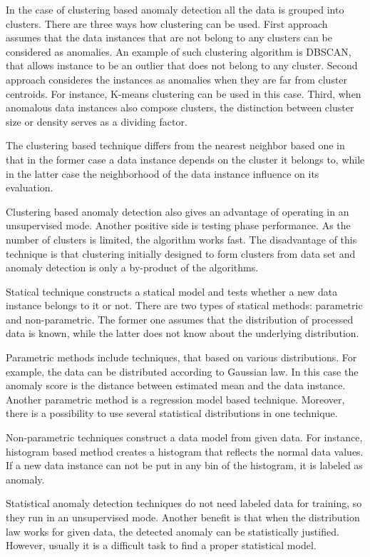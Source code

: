 In the case of clustering based anomaly detection all the data is grouped into clusters.
There are three ways how clustering can be used.
First approach assumes that the data instances that are not belong to any clusters can be considered as anomalies.
An example of such clustering algorithm is DBSCAN, that allows instance to be an outlier that does not belong to any cluster.
Second approach consideres the instances as anomalies when they are far from cluster centroids.
For instance, K-means clustering can be used in this case.
Third, when anomalous data instances also compose clusters, the distinction between cluster size or density serves as a dividing factor.

The clustering based technique differs from the nearest neighbor based one in that in the former case a data instance depends on the cluster it belongs to, while in the latter case the neighborhood of the data instance influence on its evaluation.

Clustering based anomaly detection also gives an advantage of operating in an unsupervised mode.
Another positive side is testing phase performance.
As the number of clusters is limited, the algorithm works fast.
The disadvantage of this technique is that clustering initially designed to form clusters from data set and anomaly detection is only a by-product of the algorithms.

Statical technique constructs a statical model and tests whether a new data instance belongs to it or not.
There are two types of statical methods: parametric and non-parametric.
The former one assumes that the distribution of processed data is known, while the latter does not know about the underlying distribution.

Parametric methods include techniques, that based on various distributions.
For example, the data can be distributed according to Gaussian law.
In this case the anomaly score is the distance between estimated mean and the data instance.
Another parametric method is a regression model based technique.
Moreover, there is a possibility to use several statistical distributions in one technique.

Non-parametric techniques construct a data model from given data.
For instance, histogram based method creates a histogram that reflects the normal data values.
If a new data instance can not be put in any bin of the histogram, it is labeled as anomaly.

Statistical anomaly detection techniques do not need labeled data for training, so they run in an unsupervised mode.
Another benefit is that when the distribution law works for given data, the detected anomaly can be statistically justified.
However, usually it is a difficult task to find a proper statistical model.

